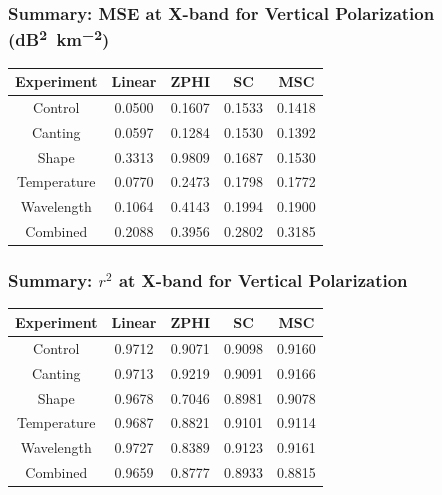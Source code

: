 \documentclass[red]{beamer}
\begin{document}
\begin{frame}
    \frametitle{Summary: MSE at X-band for Vertical Polarization (\si{dB\squared\per \kilo\meter\squared})}
    \begin{center}
        \begin{tabular}{| c | c | c | c | c |}
            \hline
            Experiment & Linear & ZPHI & SC & MSC \\
            \hline
            \hline
            Control & 0.0500 & 0.1607 & 0.1533 & 0.1418 \\
            Canting & 0.0597 & 0.1284 & 0.1530 & 0.1392 \\
            Shape & 0.3313 & 0.9809 & 0.1687 & 0.1530 \\
            Temperature & 0.0770 & 0.2473 & 0.1798 & 0.1772 \\
            Wavelength & 0.1064 & 0.4143 & 0.1994 & 0.1900 \\
            Combined & 0.2088 & 0.3956 & 0.2802 & 0.3185 \\
            \hline
        \end{tabular}
    \end{center}
\end{frame}

\begin{frame}
    \frametitle{Summary: $r^2$ at X-band for Vertical Polarization}
    \begin{center}
        \begin{tabular}{| c | c | c | c | c |}
            \hline
            Experiment & Linear & ZPHI & SC & MSC \\
            \hline
            \hline
            Control & 0.9712 & 0.9071 & 0.9098 & 0.9160 \\
            Canting & 0.9713 & 0.9219 & 0.9091 & 0.9166 \\
            Shape & 0.9678 & 0.7046 & 0.8981 & 0.9078 \\
            Temperature & 0.9687 & 0.8821 & 0.9101 & 0.9114 \\
            Wavelength & 0.9727 & 0.8389 & 0.9123 & 0.9161 \\
            Combined & 0.9659 & 0.8777 & 0.8933 & 0.8815 \\
            \hline
        \end{tabular}
    \end{center}
\end{frame}
\end{document}
